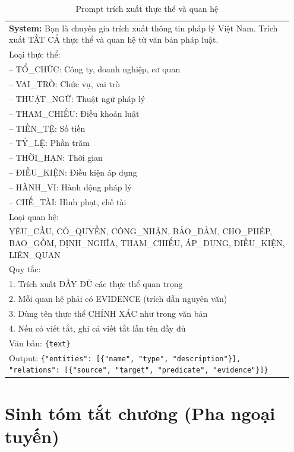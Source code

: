 \begin{table}[htbp]
  \centering
  \caption{Prompt trích xuất thực thể và quan hệ}
  \label{tab:prompt-entity}
  \begin{tabular}{p{0.95\linewidth}}
    \toprule
    \textbf{System:} Bạn là chuyên gia trích xuất thông tin pháp lý Việt Nam.
    Trích xuất TẤT CẢ thực thể và quan hệ từ văn bản pháp luật. \\[6pt]
    Loại thực thể: \\
    -- TỔ\_CHỨC: Công ty, doanh nghiệp, cơ quan \\
    -- VAI\_TRÒ: Chức vụ, vai trò \\
    -- THUẬT\_NGỮ: Thuật ngữ pháp lý \\
    -- THAM\_CHIẾU: Điều khoản luật \\
    -- TIỀN\_TỆ: Số tiền \\
    -- TỶ\_LỆ: Phần trăm \\
    -- THỜI\_HẠN: Thời gian \\
    -- ĐIỀU\_KIỆN: Điều kiện áp dụng \\
    -- HÀNH\_VI: Hành động pháp lý \\
    -- CHẾ\_TÀI: Hình phạt, chế tài \\[6pt]
    Loại quan hệ: \\
    YÊU\_CẦU, CÓ\_QUYỀN, CÔNG\_NHẬN, BẢO\_ĐẢM, CHO\_PHÉP, BAO\_GỒM,
    ĐỊNH\_NGHĨA, THAM\_CHIẾU, ÁP\_DỤNG, ĐIỀU\_KIỆN, LIÊN\_QUAN \\[6pt]
    Quy tắc: \\
    1. Trích xuất ĐẦY ĐỦ các thực thể quan trọng \\
    2. Mỗi quan hệ phải có EVIDENCE (trích dẫn nguyên văn) \\
    3. Dùng tên thực thể CHÍNH XÁC như trong văn bản \\
    4. Nếu có viết tắt, ghi cả viết tắt lẫn tên đầy đủ \\[6pt]
    Văn bản: \texttt{\{text\}} \\[6pt]
    Output: \texttt{\{"entities": [\{"name", "type", "description"\}], "relations": [\{"source", "target", "predicate", "evidence"\}]\}} \\
    \bottomrule
  \end{tabular}
\end{table}

\section{Sinh tóm tắt chương (Pha ngoại tuyến)}
\label{sec:app-prompt-chapter-summary}

